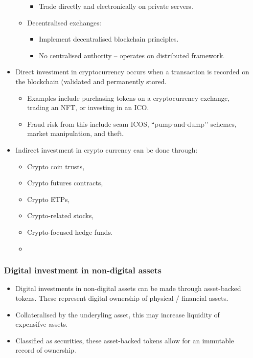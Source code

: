 \documentclass[../notes_compiled.tex]{subfiles}
\begin{document}
\begin{itemize}
\begin{itemize}
\begin{itemize}
\item Trade directly and electronically on private servers.
\end{itemize}
\item Decentralised exchanges:
\begin{itemize}
\item Implement decentralised blockchain principles.
\item No centralised authority -- operates on distributed framework.
\end{itemize}
\end{itemize}
\item Direct investment in cryptocurrency occurs when a transaction is recorded on the blockchain (validated and permanently stored.
\begin{itemize}
\item Examples include purchasing tokens on a cryptocurrency exchange, trading an NFT, or investing in an ICO. 
\item Fraud risk from this include scam ICOS, ``pump-and-dump’’ schemes, market manipulation, and theft.
\end{itemize}
\item Indirect investment in crypto currency can be done through:
\begin{multicols}{2}
\begin{itemize}
\item Crypto coin trusts,
\item Crypto futures contracts,
\item Crypto ETPs,
\item Crypto-related stocks,
\item Crypto-focused hedge funds.
\item []
\end{itemize}
\end{multicols}
\end{itemize}

\subsubsection{Digital investment in non-digital assets}
\begin{itemize}
\item Digital investments in non-digital assets can be made through asset-backed tokens. These represent digital ownership of physical / financial assets.
\item Collateralised by the underyling asset, this may increase liquidity of expensifve assets.
\item Classified as securities, these asset-backed tokens allow for an immutable record of ownership.
\end{itemize}
\end{document}
